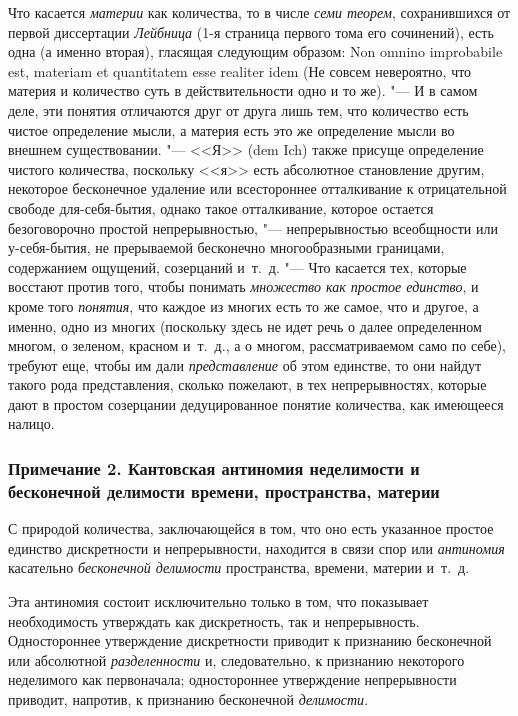 Что касается {\em материи} как количества, то в числе
{\em семи теорем}, сохранившихся от первой
диссертации  {\em Лейбница} (1-я страница первого тома его
сочинений), есть одна (а именно вторая), гласящая следующим образом: Non
omnino improbabile est, materiam et quantitatem esse realiter idem
(Не совсем невероятно, что материя и количество суть в действительности
одно и то же). "--- И в самом деле, эти понятия отличаются друг от друга лишь
тем, что количество есть чистое определение мысли, а материя есть это же
определение мысли во внешнем существовании. "--- <<Я>> (dem Ich) также присуще
определение чистого количества, поскольку <<я>> есть абсолютное становление
другим, некоторое бесконечное удаление или всестороннее отталкивание к
отрицательной свободе для-себя-бытия, однако такое отталкивание, которое
остается безоговорочно простой непрерывностью, "--- непрерывностью всеобщности
или у-себя-бытия, не прерываемой бесконечно многообразными границами,
содержанием ощущений, созерцаний и~т.~д. "--- Что касается тех, которые
восстают против того, чтобы понимать {\em множество как
простое единство}, и кроме того {\em понятия}, что
каждое из многих есть то же самое, что и другое, а именно, одно из многих
(поскольку здесь не идет речь о далее определенном многом, о зеленом,
красном и~т.~д., а о многом, рассматриваемом само по себе), требуют еще,
чтобы им дали {\em представление} об этом единстве, то
они найдут такого рода представления, сколько пожелают, в тех
непрерывностях, которые дают в простом созерцании дедуцированное понятие
количества, как имеющееся налицо.

\subsubsection[Примечание 2. Кантовская антиномия неделимости и бесконечной делимости времени, пространства, материи]
{Примечание 2. Кантовская антиномия неделимости и бесконечной делимости времени, пространства, материи}

\label{bkm:bm88a}
С природой количества, заключающейся в том, что оно есть указанное простое
единство дискретности и непрерывности, находится в связи спор или
{\em антиномия} касательно
{\em бесконечной делимости} пространства, времени,
материи и~т.~д.

Эта антиномия состоит исключительно только в том, что показывает
необходимость утверждать как дискретность, так и непрерывность.
Одностороннее утверждение дискретности приводит к признанию бесконечной или
абсолютной {\em разделенности} и, следовательно, к
признанию некоторого неделимого как первоначала; одностороннее утверждение
непрерывности приводит, напротив, к признанию бесконечной
{\em делимости}.

